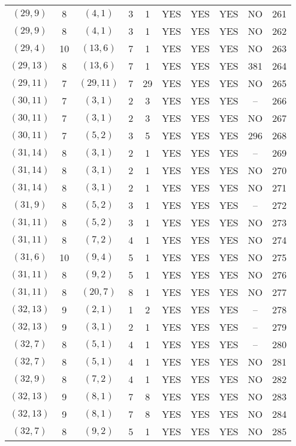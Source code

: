 \begin{longtable}{|c|c|c|c|c|c|c|c|c|c|}
$(29, 9)$ & 8 & $(4, 1)$ & 3 & 1 & YES & YES & YES & NO & 261\\
$(29, 9)$ & 8 & $(4, 1)$ & 3 & 1 & YES & YES & YES & NO & 262\\
$(29, 4)$ & 10 & $(13, 6)$ & 7 & 1 & YES & YES & YES & NO & 263\\
$(29, 13)$ & 8 & $(13, 6)$ & 7 & 1 & YES & YES & YES & 381 & 264\\
$(29, 11)$ & 7 & $(29, 11)$ & 7 & 29 & YES & YES & YES & NO & 265\\
$(30, 11)$ & 7 & $(3, 1)$ & 2 & 3 & YES & YES & YES & -- & 266\\
$(30, 11)$ & 7 & $(3, 1)$ & 2 & 3 & YES & YES & YES & NO & 267\\
$(30, 11)$ & 7 & $(5, 2)$ & 3 & 5 & YES & YES & YES & 296 & 268\\
$(31, 14)$ & 8 & $(3, 1)$ & 2 & 1 & YES & YES & YES & -- & 269\\
$(31, 14)$ & 8 & $(3, 1)$ & 2 & 1 & YES & YES & YES & NO & 270\\
$(31, 14)$ & 8 & $(3, 1)$ & 2 & 1 & YES & YES & YES & NO & 271\\
$(31, 9)$ & 8 & $(5, 2)$ & 3 & 1 & YES & YES & YES & -- & 272\\
$(31, 11)$ & 8 & $(5, 2)$ & 3 & 1 & YES & YES & YES & NO & 273\\
$(31, 11)$ & 8 & $(7, 2)$ & 4 & 1 & YES & YES & YES & NO & 274\\
$(31, 6)$ & 10 & $(9, 4)$ & 5 & 1 & YES & YES & YES & NO & 275\\
$(31, 11)$ & 8 & $(9, 2)$ & 5 & 1 & YES & YES & YES & NO & 276\\
$(31, 11)$ & 8 & $(20, 7)$ & 8 & 1 & YES & YES & YES & NO & 277\\
$(32, 13)$ & 9 & $(2, 1)$ & 1 & 2 & YES & YES & YES & -- & 278\\
$(32, 13)$ & 9 & $(3, 1)$ & 2 & 1 & YES & YES & YES & -- & 279\\
$(32, 7)$ & 8 & $(5, 1)$ & 4 & 1 & YES & YES & YES & -- & 280\\
$(32, 7)$ & 8 & $(5, 1)$ & 4 & 1 & YES & YES & YES & NO & 281\\
$(32, 9)$ & 8 & $(7, 2)$ & 4 & 1 & YES & YES & YES & NO & 282\\
$(32, 13)$ & 9 & $(8, 1)$ & 7 & 8 & YES & YES & YES & NO & 283\\
$(32, 13)$ & 9 & $(8, 1)$ & 7 & 8 & YES & YES & YES & NO & 284\\
$(32, 7)$ & 8 & $(9, 2)$ & 5 & 1 & YES & YES & YES & NO & 285\\

\end{longtable}

